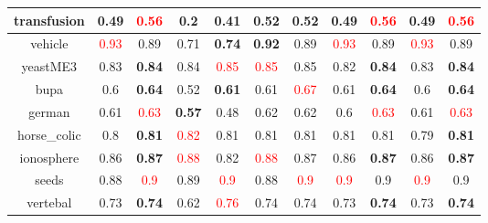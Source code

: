 \documentclass{article}%
\begin{document}
\begin{tabular}{c|cccccccccc}
\hline%
transfusion&0.49&\textcolor{red}{ 
0.56
}&0.2&\textbf{0.41}&0.52&0.52&0.49&\textcolor{red}{ 
0.56
}&0.49&\textcolor{red}{ 
0.56
}\\%
\hline%
vehicle&\textcolor{red}{ 
0.93
}&0.89&0.71&\textbf{0.74}&\textbf{0.92}&0.89&\textcolor{red}{ 
0.93
}&0.89&\textcolor{red}{ 
0.93
}&0.89\\%
\hline%
yeastME3&0.83&\textbf{0.84}&0.84&\textcolor{red}{ 
0.85
}&\textcolor{red}{ 
0.85
}&0.85&0.82&\textbf{0.84}&0.83&\textbf{0.84}\\%
\hline%
bupa&0.6&\textbf{0.64}&0.52&\textbf{0.61}&0.61&\textcolor{red}{ 
0.67
}&0.61&\textbf{0.64}&0.6&\textbf{0.64}\\%
\hline%
german&0.61&\textcolor{red}{ 
0.63
}&\textbf{0.57}&0.48&0.62&0.62&0.6&\textcolor{red}{ 
0.63
}&0.61&\textcolor{red}{ 
0.63
}\\%
\hline%
horse\_colic&0.8&\textbf{0.81}&\textcolor{red}{ 
0.82
}&0.81&0.81&0.81&0.81&0.81&0.79&\textbf{0.81}\\%
\hline%
ionosphere&0.86&\textbf{0.87}&\textcolor{red}{ 
0.88
}&0.82&\textcolor{red}{ 
0.88
}&0.87&0.86&\textbf{0.87}&0.86&\textbf{0.87}\\%
\hline%
seeds&0.88&\textcolor{red}{ 
0.9
}&0.89&\textcolor{red}{ 
0.9
}&0.88&\textcolor{red}{ 
0.9
}&\textcolor{red}{ 
0.9
}&0.9&\textcolor{red}{ 
0.9
}&0.9\\%
\hline%
vertebal&0.73&\textbf{0.74}&0.62&\textcolor{red}{ 
0.76
}&0.74&0.74&0.73&\textbf{0.74}&0.73&\textbf{0.74}\\%
\hline%
\end{tabular}

%
\end{document}
